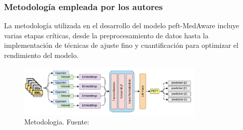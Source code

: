 \subsubsection{Metodología empleada por los autores}
	La metodología utilizada en el desarrollo del modelo peft-MedAware incluye varias etapas críticas, desde la preprocesamiento de datos hasta la implementación de técnicas de ajuste fino y cuantificación para optimizar el rendimiento del modelo.
			\begin{figure}[H]
			\begin{center}
				\includegraphics[width=0.8\textwidth]{2/1_antecedentes/Metodologia1- 2.png}
			\caption{Metodologia. Fuente: \cite{peftmedaware_2023}}
			\end{center}
			\end{figure}
			\vspace{-10mm}
